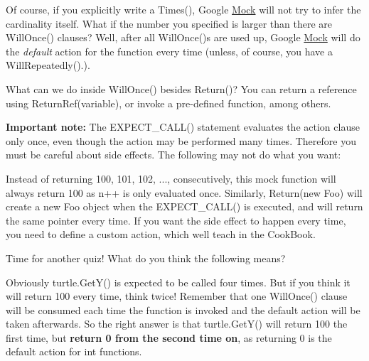 Of course, if you explicitly write a {\ttfamily Times()}, Google \mbox{\hyperlink{class_mock}{Mock}} will not try to infer the cardinality itself. What if the number you specified is larger than there are {\ttfamily Will\+Once()} clauses? Well, after all {\ttfamily Will\+Once()}s are used up, Google \mbox{\hyperlink{class_mock}{Mock}} will do the {\itshape default} action for the function every time (unless, of course, you have a {\ttfamily Will\+Repeatedly()}.).

What can we do inside {\ttfamily Will\+Once()} besides {\ttfamily Return()}? You can return a reference using {\ttfamily Return\+Ref(variable)}, or invoke a pre-\/defined function, among others.

{\bfseries{Important note\+:}} The {\ttfamily E\+X\+P\+E\+C\+T\+\_\+\+C\+A\+L\+L()} statement evaluates the action clause only once, even though the action may be performed many times. Therefore you must be careful about side effects. The following may not do what you want\+:


\begin{DoxyCode}{0}
\end{DoxyCode}


Instead of returning 100, 101, 102, ..., consecutively, this mock function will always return 100 as {\ttfamily n++} is only evaluated once. Similarly, {\ttfamily Return(new Foo)} will create a new {\ttfamily Foo} object when the {\ttfamily E\+X\+P\+E\+C\+T\+\_\+\+C\+A\+L\+L()} is executed, and will return the same pointer every time. If you want the side effect to happen every time, you need to define a custom action, which we\textquotesingle{}ll teach in the Cook\+Book.

Time for another quiz! What do you think the following means?


\begin{DoxyCode}{0}
\end{DoxyCode}


Obviously {\ttfamily turtle.\+Get\+Y()} is expected to be called four times. But if you think it will return 100 every time, think twice! Remember that one {\ttfamily Will\+Once()} clause will be consumed each time the function is invoked and the default action will be taken afterwards. So the right answer is that {\ttfamily turtle.\+Get\+Y()} will return 100 the first time, but {\bfseries{return 0 from the second time on}}, as returning 0 is the default action for {\ttfamily int} functions.

